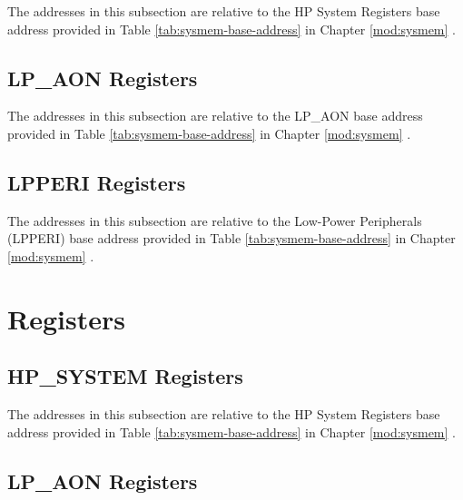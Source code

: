 \documentclass[main\_\_EN.tex]{subfiles}
\begin{document}
The addresses in this subsection are relative to the HP System Registers base address provided in Table \ref{tab:sysmem-base-address} in Chapter \ref{mod:sysmem} \textit{}.



\subsection{LP\_AON Registers}
\label{sec:sysreg-reg-summ-lpaon}

The addresses in this subsection are relative to the LP\_AON base address provided in Table \ref{tab:sysmem-base-address} in Chapter \ref{mod:sysmem} \textit{}.



\subsection{LPPERI Registers}
\label{sec:sysreg-reg-summ-lpperi}

The addresses in this subsection are relative to the Low-Power Peripherals (LPPERI) base address provided in Table \ref{tab:sysmem-base-address} in Chapter \ref{mod:sysmem} \textit{}.





\clearpage
\section{Registers}

\subsection{HP\_SYSTEM Registers}
\label{sec:sysreg-reg-sysreg}

The addresses in this subsection are relative to the HP System Registers base address provided in Table \ref{tab:sysmem-base-address} in Chapter \ref{mod:sysmem} \textit{}.


\newpage
\subsection{LP\_AON Registers}
\label{sec:sysreg-reg-lpaon}
\end{document}
